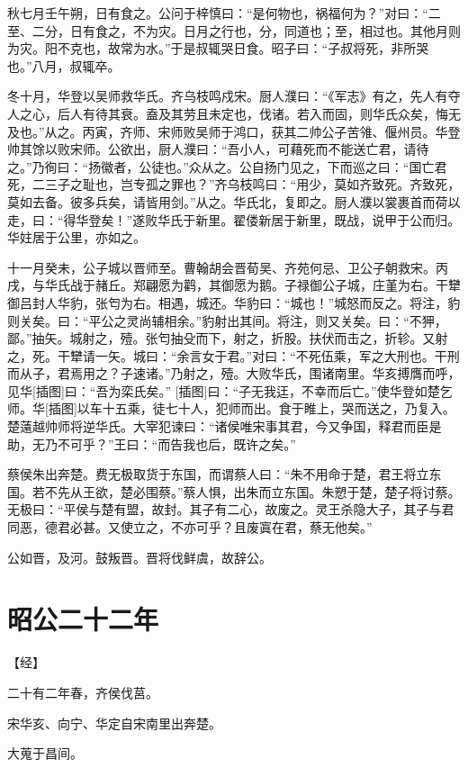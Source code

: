 \documentclass[a4paper,12pt,UTF8,twoside]{ctexbook}
\begin{document}
秋七月壬午朔，日有食之。公问于梓慎曰：“是何物也，祸福何为？”对曰：“二至、二分，日有食之，不为灾。日月之行也，分，同道也；至，相过也。其他月则为灾。阳不克也，故常为水。”于是叔辄哭日食。昭子曰：“子叔将死，非所哭也。”八月，叔辄卒。

冬十月，华登以吴师救华氏。齐乌枝鸣戍宋。厨人濮曰：“《军志》有之，先人有夺人之心，后人有待其衰。盍及其劳且未定也，伐诸。若入而固，则华氏众矣，悔无及也。”从之。丙寅，齐师、宋师败吴师于鸿口，获其二帅公子苦雂、偃州员。华登帅其馀以败宋师。公欲出，厨人濮曰：“吾小人，可藉死而不能送亡君，请待之。”乃徇曰：“扬徽者，公徒也。”众从之。公自扬门见之，下而巡之曰：“国亡君死，二三子之耻也，岂专孤之罪也？”齐乌枝鸣曰：“用少，莫如齐致死。齐致死，莫如去备。彼多兵矣，请皆用剑。”从之。华氏北，复即之。厨人濮以裳裹首而荷以走，曰：“得华登矣！”遂败华氏于新里。翟偻新居于新里，既战，说甲于公而归。华妵居于公里，亦如之。

十一月癸未，公子城以晋师至。曹翰胡会晋荀吴、齐苑何忌、卫公子朝救宋。丙戌，与华氏战于赭丘。郑翩愿为鹳，其御愿为鹅。子禄御公子城，庄堇为右。干犫御吕封人华豹，张匄为右。相遇，城还。华豹曰：“城也！”城怒而反之。将注，豹则关矣。曰：“平公之灵尚辅相余。”豹射出其间。将注，则又关矣。曰：“不狎，鄙。”抽矢。城射之，殪。张匄抽殳而下，射之，折股。扶伏而击之，折轸。又射之，死。干犫请一矢。城曰：“余言女于君。”对曰：“不死伍乘，军之大刑也。干刑而从子，君焉用之？子速诸。”乃射之，殪。大败华氏，围诸南里。华亥搏膺而呼，见华[插图]曰：“吾为栾氏矣。” [插图]曰：“子无我迋，不幸而后亡。”使华登如楚乞师。华[插图]以车十五乘，徒七十人，犯师而出。食于睢上，哭而送之，乃复入。楚薳越帅师将逆华氏。大宰犯谏曰：“诸侯唯宋事其君，今又争国，释君而臣是助，无乃不可乎？”王曰：“而告我也后，既许之矣。”

蔡侯朱出奔楚。费无极取货于东国，而谓蔡人曰：“朱不用命于楚，君王将立东国。若不先从王欲，楚必围蔡。”蔡人惧，出朱而立东国。朱愬于楚，楚子将讨蔡。无极曰：“平侯与楚有盟，故封。其子有二心，故废之。灵王杀隐大子，其子与君同恶，德君必甚。又使立之，不亦可乎？且废寘在君，蔡无他矣。”

公如晋，及河。鼓叛晋。晋将伐鲜虞，故辞公。

\chapter{昭公二十二年}



【经】

二十有二年春，齐侯伐莒。

宋华亥、向宁、华定自宋南里出奔楚。

大蒐于昌间。
\end{document}
